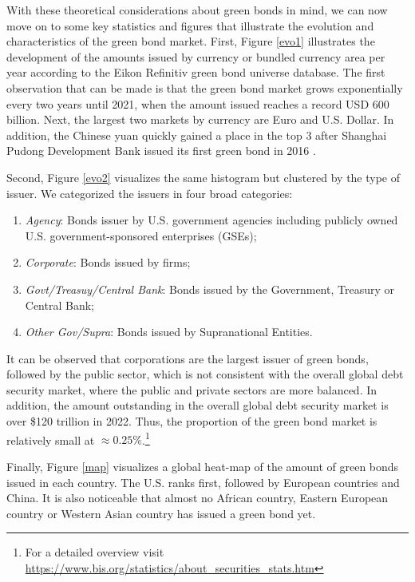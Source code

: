 With these theoretical considerations about green bonds in mind, we can now move on to some key statistics and figures that illustrate the evolution and characteristics of the green bond market. First, Figure \ref{evo1} illustrates the development of the amounts issued by currency or bundled currency area per year according to the Eikon Refinitiv green bond universe database. The first observation that can be made is that the green bond market grows exponentially every two years until 2021, when the amount issued reaches a record USD 600 billion. Next, the largest two markets by currency are Euro and U.S. Dollar. In addition, the Chinese yuan quickly gained a place in the top 3 after Shanghai Pudong Development Bank issued its first green bond in 2016 \citep[p. 1]{wang2020market}.

Second, Figure \ref{evo2} visualizes the same histogram but clustered by the type of issuer. We categorized the issuers in four broad categories:

\begin{enumerate}
    \item \textit{Agency}: Bonds issuer by U.S. government agencies including publicly owned U.S. government-sponsored enterprises (GSEs);
    \item \textit{Corporate}: Bonds issued by firms;
    \item \textit{Govt/Treasuy/Central Bank}: Bonds issued by the Government, Treasury or Central Bank;
    \item \textit{Other Gov/Supra}: Bonds issued by Supranational Entities.
\end{enumerate}

It can be observed that corporations are the largest issuer of green bonds, followed by the public sector, which is not consistent with the overall global debt security market, where the public and private sectors are more balanced. In addition, the amount outstanding in the overall global debt security market is over \$120 trillion in 2022. Thus, the proportion of the green bond market is relatively small at $\approx0.25\%$.\footnote{For a detailed overview visit \url{https://www.bis.org/statistics/about_securities_stats.htm}}

Finally, Figure \ref{map} visualizes a global heat-map of the amount of green bonds issued in each country. The U.S. ranks first, followed by European countries and China. It is also noticeable that almost no African country, Eastern European country or Western Asian country has issued a green bond yet.

